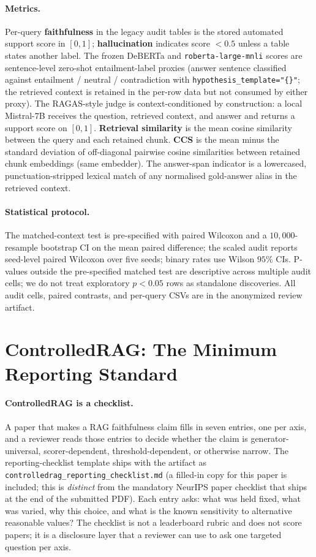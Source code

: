 \paragraph{Metrics.} Per-query \textbf{faithfulness} in the legacy
audit tables is the stored automated support score in $[0,1]$;
\textbf{hallucination} indicates score $<0.5$ unless a table states
another label. The frozen DeBERTa and \texttt{roberta-large-mnli}
scores are sentence-level zero-shot entailment-label proxies (answer
sentence classified against entailment / neutral / contradiction with
\texttt{hypothesis\_template="\{\}"}; the retrieved context is
retained in the per-row data but not consumed by either proxy). The
RAGAS-style judge is context-conditioned by construction: a local
Mistral-$7$B receives the question, retrieved context, and answer and
returns a support score on $[0,1]$. \textbf{Retrieval similarity} is
the mean cosine similarity between the query and each retained chunk.
\textbf{CCS} is the mean minus the standard deviation of off-diagonal
pairwise cosine similarities between retained chunk embeddings (same
embedder). The answer-span indicator is a lowercased,
punctuation-stripped lexical match of any normalised gold-answer
alias in the retrieved context.

\paragraph{Statistical protocol.} The matched-context test is
pre-specified with paired Wilcoxon and a $10{,}000$-resample
bootstrap CI on the mean paired difference; the scaled audit reports
seed-level paired Wilcoxon over five seeds; binary rates use Wilson
$95\%$ CIs. P-values outside the pre-specified matched test are
descriptive across multiple audit cells; we do not treat exploratory
$p<0.05$ rows as standalone discoveries. All audit cells, paired
contrasts, and per-query CSVs are in the anonymized review artifact.

\section{ControlledRAG: The Minimum Reporting Standard}
\label{sec:controlledrag}

\paragraph{ControlledRAG is a checklist.} A paper that makes a RAG
faithfulness claim fills in seven entries, one per axis, and a
reviewer reads those entries to decide whether the claim is
generator-universal, scorer-dependent, threshold-dependent, or
otherwise narrow. The reporting-checklist template ships with the
artifact as
\texttt{controlledrag\_reporting\_checklist.md} (a filled-in copy
for this paper is included; this is \emph{distinct} from the
mandatory NeurIPS paper checklist that ships at the end of the
submitted PDF). Each entry asks: what was held fixed, what was
varied, why this choice, and what is the known sensitivity to
alternative reasonable values? The checklist is not a leaderboard
rubric and does not score papers; it is a disclosure layer that a
reviewer can use to ask one targeted question per axis.

